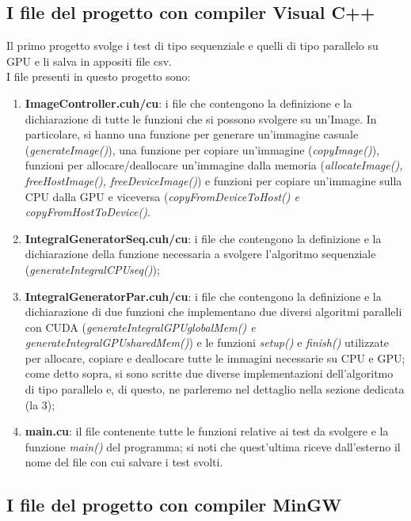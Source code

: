 \documentclass[10pt,twocolumn,letterpaper]{article}
\begin{document}
\subsection{I file del progetto con compiler Visual C++}

Il primo progetto svolge i test di tipo sequenziale e quelli di tipo parallelo su GPU e li salva in appositi file csv.\\
I file presenti in questo progetto sono:

\begin{enumerate}
\item{\textbf{ImageController.cuh/cu}: i file che contengono la definizione e la dichiarazione di tutte le funzioni che si possono svolgere su un’Image. In particolare, si hanno una funzione per generare un’immagine casuale (\textit{generateImage()}), una funzione per copiare un’immagine (\textit{copyImage()}), funzioni per allocare/deallocare un’immagine dalla memoria (\textit{allocateImage(), freeHostImage(), freeDeviceImage()}) e funzioni per copiare un’immagine sulla CPU dalla GPU e viceversa (\textit{copyFromDeviceToHost() e copyFromHostToDevice()}.}
\item{\textbf{IntegralGeneratorSeq.cuh/cu}: i file che contengono la definizione e la dichiarazione della funzione necessaria a svolgere l’algoritmo sequenziale (\textit{generateIntegralCPUseq()});}
\item{\textbf{IntegralGeneratorPar.cuh/cu}: i file che contengono la definizione e la dichiarazione di due funzioni che implementano due diversi algoritmi paralleli con CUDA (\textit{generateIntegralGPUglobalMem() e generateIntegralGPUsharedMem()}) e le funzioni \textit{setup()} e \textit{finish()} utilizzate per allocare, copiare e deallocare tutte le immagini necessarie su CPU e GPU; come detto sopra, si sono scritte due diverse implementazioni dell’algoritmo di tipo parallelo e, di questo, ne parleremo nel dettaglio nella sezione dedicata (la 3);}
\item{\textbf{main.cu}: il file contenente tutte le funzioni relative ai test da svolgere e la funzione \textit{main()} del programma; si noti che quest'ultima riceve dall'esterno il nome del file con cui salvare i test svolti.}
\end{enumerate}


\subsection{I file del progetto con compiler MinGW}
\end{document}
